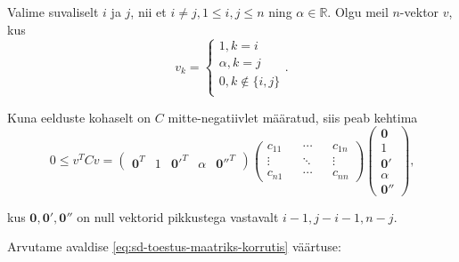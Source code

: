 \documentclass[a4paper,12pt]{article}
\numberwithin{equation}{section}
\theoremstyle{definition}
\begin{document}
Valime suvaliselt $i$ ja $j$, nii et $i \neq j, 1 \leq i,j \leq n$ ning $\alpha \in \mathbb{R}$. Olgu meil $n$-vektor $v$, kus
\begin{equation*}
v_k =
\begin{cases}
1, k=i \\
\alpha, k=j \\
0, k \not \in \lbrace i, j \rbrace \\
\end{cases} \text{.}
\end{equation*}

Kuna eelduste kohaselt on $C$ mitte-negatiivlet määratud, siis peab kehtima 
\begin{equation}
\label{eq:sd-toestus-maatriks-korrutis}
0 \leq v^{T}Cv = 
\begin{pmatrix}
\mathbf{0}^T & 1 & \mathbf{0'}^T & \alpha & \mathbf{0''}^T
\end{pmatrix}
\begin{pmatrix}
c_{11} && \cdots && c_{1n} \\
\vdots && \ddots && \vdots \\
c_{n1} && \cdots && c_{nn}  
\end{pmatrix}
\begin{pmatrix}
\mathbf{0} \\ 
1 \\
\mathbf{0'} \\
\alpha \\
\mathbf{0''} 
\end{pmatrix} \text{,}
\end{equation}

kus $\mathbf{0},\mathbf{0'},\mathbf{0''}$ on null vektorid pikkustega vastavalt $i-1,j-i-1, n -j$.



Arvutame avaldise \ref{eq:sd-toestus-maatriks-korrutis} väärtuse:
\end{document}
